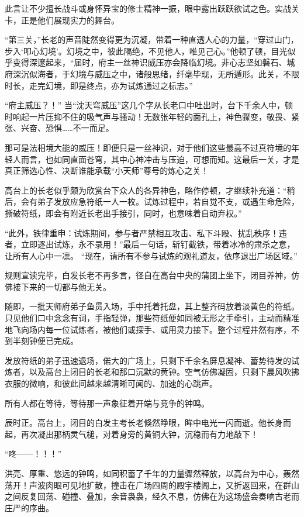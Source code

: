 此言让不少擅长战斗或身怀异宝的修士精神一振，眼中露出跃跃欲试之色。实战关卡，正是他们展现实力的舞台。

“第三关，”长老的声音陡然变得更为沉凝，带着一种直透人心的力量，“穿过山门，步入‘叩心幻境’。幻境之中，彼此隔绝，不见他人，唯见己心。”他顿了顿，目光似乎变得深邃起来，“届时，府主一丝神识威压亦会降临幻境。非心志坚如磐石、城府深沉似海者，于幻境与威压之中，诸般思绪，纤毫毕现，无所遁形。此关，不限时长，走完幻境，即是终点，亦为试炼通过之标志。”

“府主威压？！” 当“沈天穹威压”这几个字从长老口中吐出时，台下千余人中，顿时响起一片压抑不住的吸气声与骚动！无数张年轻的面孔上，神色骤变，敬畏、紧张、兴奋、恐惧……不一而足。

那可是法相境大能的威压！即便只是一丝神识，对于他们这些最高不过真符境的年轻人而言，也如同直面苍穹，其中心神冲击与压迫，可想而知。这最后一关，才是真正筛选心性、决断谁能承载“小天师”尊号的炼心之关！

高台上的长老似乎颇为欣赏台下众人的各异神色，略作停顿，才继续补充道：“稍后，会有弟子发放应急符纸一人一枚。试炼过程中，若自觉不支，或遇生命危险，撕破符纸，即会有附近长老出手接引，同时，也意味着自动弃权。”

“此外，铁律重申：试炼期间，参与者严禁相互攻击、私下斗殴、扰乱秩序！违者，立即逐出试炼，永不录用！”最后一句话，斩钉截铁，带着冰冷的肃杀之意，让所有人心中一凛。 “现在，请所有不参与试炼的观礼道友，依序退出广场区域。”

规则宣读完毕，白发长老不再多言，径自在高台中央的蒲团上坐下，闭目养神，仿佛接下来的一切都与他无关。

随即，一批天师府弟子鱼贯入场，手中托着托盘，其上整齐码放着淡黄色的符纸。只见他们口中念念有词，手指轻弹，那些符纸便如同被无形之手牵引，主动而精准地飞向场内每一位试炼者，被他们或探手、或用灵力接下。整个过程井然有序，不到半刻钟便已完成。

发放符纸的弟子迅速退场，偌大的广场上，只剩下千余名屏息凝神、蓄势待发的试炼者，以及高台上闭目的长老和那口沉默的黄钟。空气仿佛凝固，只剩下晨风吹拂衣服的微响，和彼此间越来越清晰可闻的、加速的心跳声。

所有人都在等待，等待那一声象征着开端与竞争的钟鸣。

\vspace{2em}

辰时正。高台上，闭目的白发主考长老倏然睁眼，眸中电光一闪而逝。他长身而起，再次凝出那柄灵气槌，对着身旁的黄铜大钟，沉稳而有力地敲下！

“咚——！！！”

洪亮、厚重、悠远的钟鸣，如同积蓄了千年的力量骤然释放，以高台为中心，轰然荡开！声波肉眼可见地扩散，撞击在广场四周的殿宇楼阁上，又折返回来，在群山之间反复回荡、碰撞、叠加，余音袅袅，经久不息，仿佛在为这场盛会奏响古老而庄严的序曲。

